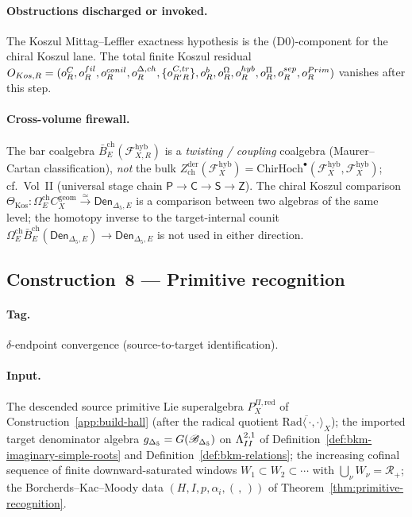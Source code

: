 \paragraph{Obstructions discharged or invoked.}
The Koszul Mittag--Leffler exactness hypothesis is the
\textup{(D0)}-component for the chiral Koszul lane.  The total finite
Koszul residual
\(O_{Kos,R}=
(o^C_R,o^{fil}_R,
o^{conil}_R,o^{\Delta,ch}_R,
\{o^{C,tr}_{R'R}\},o^b_R,
o^\Omega_R,o^{hyb}_R,
o^\Pi_R,o^{sep}_R,
o^{Prim}_R)\)
vanishes after this step.

\paragraph{Cross-volume firewall.}  The bar coalgebra
\(\bar B_E^{\mathrm{ch}}
(\mathcal F_{X,R}^{\mathrm{hyb}})\) is a \emph{twisting / coupling}
coalgebra (Maurer--Cartan classification), \emph{not} the bulk
\(Z^{\mathrm{der}}_{\mathrm{ch}}(\mathcal F_X^{\mathrm{hyb}})
=\mathrm{ChirHoch}^\bullet(\mathcal F_X^{\mathrm{hyb}},
\mathcal F_X^{\mathrm{hyb}})\); cf.\ Vol~II
\cite{ChiralBarCobarVolII} (universal stage chain
\(\mathsf P\to\mathsf C\to\mathsf S\to\mathsf Z\)).
The chiral Koszul comparison
\(\Theta_{\mathrm{Kos}}:\Omega_E^{\mathrm{ch}}C_X^{\mathrm{geom}}
\xrightarrow{\simeq}\mathsf{Den}_{\Delta_5,E}\) is a comparison
between two algebras of the same level; the homotopy inverse to the
target-internal counit
\(\Omega_E^{\mathrm{ch}}\bar B_E^{\mathrm{ch}}
(\mathsf{Den}_{\Delta_5,E})\to\mathsf{Den}_{\Delta_5,E}\) is not used
in either direction.

\subsection{Construction~8 — Primitive recognition}
\label{app:build-recognition}

\paragraph{Tag.} \(\delta\)-endpoint convergence
(source-to-target identification).

\paragraph{Input.}
The descended source primitive Lie superalgebra
\(P_X^{\Pi,\mathrm{red}}\) of
Construction~\ref{app:build-hall} (after the radical quotient
\(\overline{\mathrm{Rad}\langle\,\cdot,\cdot\rangle_X}\)); the imported
target denominator algebra
\(g_{\Delta_5}=G(\mathscr B_{\Delta_5})\) on
\(\Lambda^{2,1}_{II}\) of Definition~\ref{def:bkm-imaginary-simple-roots} and
Definition~\ref{def:bkm-relations}; the increasing cofinal
sequence of finite downward-saturated windows
\(W_1\subset W_2\subset\cdots\) with
\(\bigcup_\nu W_\nu=\mathcal R_+\); the Borcherds--Kac--Moody data
\((H,I,p,\alpha_i,(\,,\,))\) of
Theorem~\ref{thm:primitive-recognition}.

